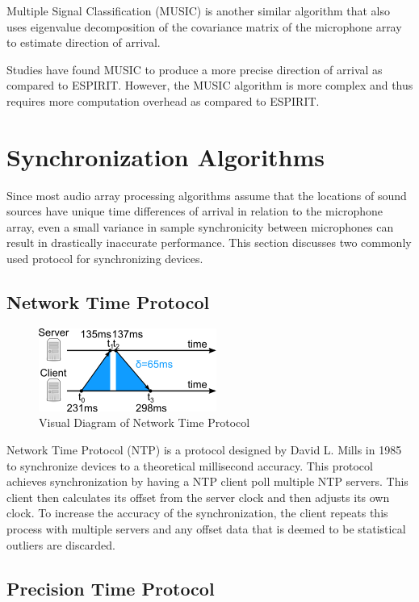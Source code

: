 \documentclass[hidelinks,12pt]{report} %
\begin{document}
Multiple Signal Classification (MUSIC) is another similar algorithm that also uses eigenvalue decomposition of the covariance matrix of the microphone array to estimate direction of arrival\cite{11}.

Studies have found MUSIC to produce a more precise direction of arrival as compared to ESPIRIT. However, the MUSIC algorithm is more complex and thus requires more computation overhead as compared to ESPIRIT\cite{12}.


\section{Synchronization Algorithms}

Since most audio array processing algorithms assume that the locations of sound sources have unique time differences of arrival in relation to the microphone array, even a small variance in sample synchronicity between microphones can result in drastically inaccurate performance\cite{13}. This section discusses two commonly used protocol for synchronizing devices. 

\subsection{Network Time Protocol}

\begin{figure}[h]
\centering
\includegraphics[scale = 1.0]{fig2.2} 
\caption{Visual Diagram of Network Time Protocol}
\label{fig}
\end{figure}

Network Time Protocol (NTP) is a protocol designed by David L. Mills in 1985 to synchronize devices to a theoretical millisecond accuracy. This protocol achieves synchronization by having a NTP client poll multiple NTP servers. This client then calculates its offset from the server clock and then adjusts its own clock. To increase the accuracy of the synchronization, the client repeats this process with multiple servers and any offset data that is deemed to be statistical outliers are discarded\cite{14}. 

\subsection{Precision Time Protocol}
\end{document}
